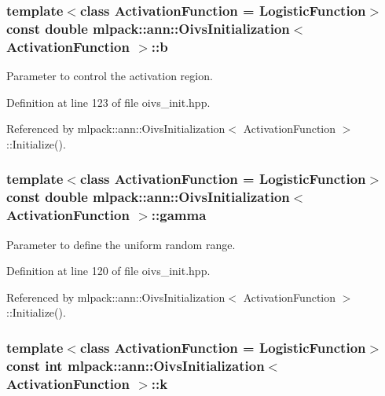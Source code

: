 \subsubsection[{b}]{\setlength{\rightskip}{0pt plus 5cm}template$<$class Activation\+Function  = Logistic\+Function$>$ const double {\bf mlpack\+::ann\+::\+Oivs\+Initialization}$<$ Activation\+Function $>$\+::b\hspace{0.3cm}{\ttfamily [private]}}\label{classmlpack_1_1ann_1_1OivsInitialization_a480e0fb4088de412628cbe805973213d}


Parameter to control the activation region. 



Definition at line 123 of file oivs\+\_\+init.\+hpp.



Referenced by mlpack\+::ann\+::\+Oivs\+Initialization$<$ Activation\+Function $>$\+::\+Initialize().

\subsubsection[{gamma}]{\setlength{\rightskip}{0pt plus 5cm}template$<$class Activation\+Function  = Logistic\+Function$>$ const double {\bf mlpack\+::ann\+::\+Oivs\+Initialization}$<$ Activation\+Function $>$\+::gamma\hspace{0.3cm}{\ttfamily [private]}}\label{classmlpack_1_1ann_1_1OivsInitialization_a376fbe1165b74f8f883710dfff73ca27}


Parameter to define the uniform random range. 



Definition at line 120 of file oivs\+\_\+init.\+hpp.



Referenced by mlpack\+::ann\+::\+Oivs\+Initialization$<$ Activation\+Function $>$\+::\+Initialize().

\subsubsection[{k}]{\setlength{\rightskip}{0pt plus 5cm}template$<$class Activation\+Function  = Logistic\+Function$>$ const int {\bf mlpack\+::ann\+::\+Oivs\+Initialization}$<$ Activation\+Function $>$\+::k\hspace{0.3cm}{\ttfamily [private]}}\label{classmlpack_1_1ann_1_1OivsInitialization_ab2f65131350aa79eec6203ab5094834a}


